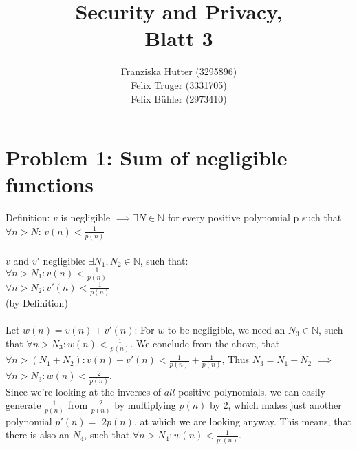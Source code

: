 \documentclass[12pt,pdftex,a4paper]{article}
\title{Security and Privacy,\\ Blatt 3}
\author{Franziska Hutter (3295896)\\
	Felix Truger (3331705)\\
	Felix Bühler (2973410)}
\newcommand\tab[1][1cm]{\hspace*{#1}}
\begin{document}
\maketitle
\pagebreak

\section*{Problem 1: Sum of negligible functions}
Definition: $v$ is negligible $\implies \exists N \in\mathbb{N}$ for every positive polynomial p such that $\forall n>N$: 
$v(n) < \frac{1}{p(n)}$
\\~\\
$v$ and $v'$ negligible: $\exists N_1, N_2 \in \mathbb{N}$, such that: \\
\tab $\forall n>N_1: v(n) < \frac{1}{p(n)}$\\
\tab $\forall n>N_2: v'(n) < \frac{1}{p(n)}$\\
(by Definition)\\
\\
Let $w(n) = v(n) + v'(n)$: For $w$ to be negligible, we need an $N_3\in\mathbb{N}$, such that $\forall n>N_3: w(n) < \frac{1}{p(n)}$.
We conclude from the above, that $\forall n>(N_1+N_2): v(n) + v'(n) < \frac{1}{p(n)} + \frac{1}{p(n)}$, Thus $N_3 = N_1 + N_2$ $\implies$ $\forall n > N_3: w(n) < \frac{2}{p(n)}$.\\ %
Since we're looking at the inverses of $all$ positive polynomials, we can easily generate $\frac{1}{p(n)}$ from $\frac{2}{p(n)}$ by multiplying $p(n)$ by 2, which makes just another polynomial $p'(n) = $ $2p(n)$, at which we are looking anyway. This means, that there is also an $N_4$, such that $\forall n>N_4: w(n) < \frac{1}{p'(n)}$.

\end{document}

